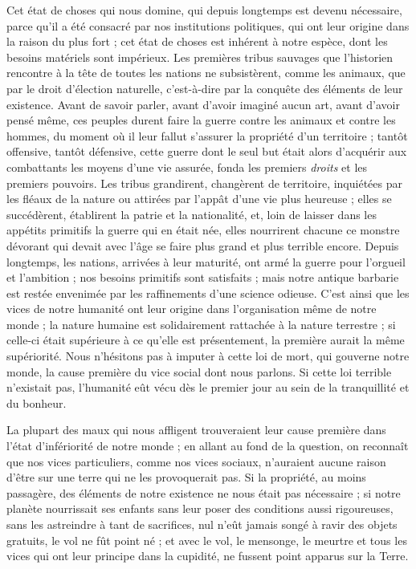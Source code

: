 \documentclass[a4paper, 11pt, oneside]{article}
\begin{document}
Cet état de choses qui nous domine, qui depuis longtemps est devenu nécessaire, parce qu'il a été consacré par nos institutions politiques, qui ont leur origine dans la raison du plus fort ; cet état de choses est inhérent à notre espèce, dont les besoins matériels sont impérieux. Les premières tribus sauvages que l'historien rencontre à la tête de toutes les nations ne subsistèrent, comme les animaux, que par le droit d'élection naturelle, c'est-à-dire par la conquête des éléments de leur existence. Avant de savoir parler, avant d'avoir imaginé aucun art, avant d'avoir pensé même, ces peuples durent faire la guerre contre les animaux et contre les hommes, du moment où il leur fallut s'assurer la propriété d'un territoire ; tantôt offensive, tantôt défensive, cette guerre dont le seul but était alors d'acquérir aux combattants les moyens d'une vie assurée, fonda les premiers \emph{droits} et les premiers pouvoirs. Les tribus grandirent, changèrent de territoire, inquiétées par les fléaux de la nature ou attirées par l'appât d'une vie plus heureuse ; elles se succédèrent, établirent la patrie et la nationalité, et, loin de laisser dans les appétits primitifs la guerre qui en était née, elles nourrirent chacune ce monstre dévorant qui devait avec l'âge se faire plus grand et plus terrible encore. Depuis longtemps, les nations, arrivées à leur maturité, ont armé la guerre pour l'orgueil et l'ambition ; nos besoins primitifs sont satisfaits ; mais notre antique barbarie est restée envenimée par les raffinements d'une science odieuse. C'est ainsi que les vices de notre humanité ont leur origine dans l'organisation même de notre monde ; la nature humaine est solidairement rattachée à la nature terrestre ; si celle-ci était supérieure à ce qu'elle est présentement, la première aurait la même supériorité. Nous n'hésitons pas à imputer à cette loi de mort, qui gouverne notre monde, la cause première du vice social dont nous parlons. Si cette loi terrible n'existait pas, l'humanité eût vécu dès le premier jour au sein de la tranquillité et du bonheur.

La plupart des maux qui nous affligent trouveraient leur cause première dans l'état d'infériorité de notre monde ; en allant au fond de la question, on reconnaît que nos vices particuliers, comme nos vices sociaux, n'auraient aucune raison d'être sur une terre qui ne les provoquerait pas. Si la propriété, au moins passagère, des éléments de notre existence ne nous était pas nécessaire ; si notre planète nourrissait ses enfants sans leur poser des conditions aussi rigoureuses, sans les astreindre à tant de sacrifices, nul n'eût jamais songé à ravir des objets gratuits, le vol ne fût point né ; et avec le vol, le mensonge, le meurtre et tous les vices qui ont leur principe dans la cupidité, ne fussent point apparus sur la Terre.
\end{document}
